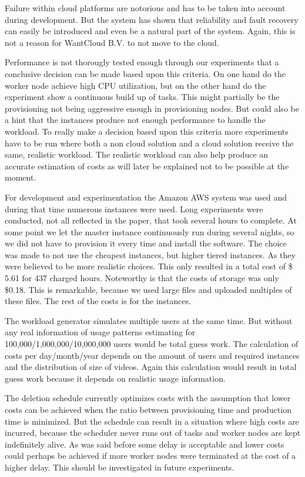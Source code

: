 \documentclass[a4paper]{IEEEtran}
\begin{document}
Failure within cloud platforms are notorious and has to be taken into account during development.
But the system has shown that reliability and fault recovery can easily be introduced
and even be a natural part of the system.
Again, this is not a reason for WantCloud B.V. to not move to the cloud.

Performance is not thorougly tested enough through our experiments that a conclusive decision can be made based upon this criteria.
On one hand do the worker node achieve high CPU utilization, but on the other hand do the experiment show a continuous build up of tasks.
This might partially be the provisioning not being aggressive enough in provisioning nodes.
But could also be a hint that the instances produce not enough performance to handle the workload.
To really make a decision based upon this criteria more experiments have to be run
where both a non cloud solution and a cloud solution receive the same, realistic workload.
The realistic workload can also help produce an accurate estimation of costs as will later be explained not to be possible at the moment.

For development and experimentation the Amazon AWS system was used and during that time numerous instances were used.
Long experiments were conducted, not all reflected in the paper, that took several hours to complete.
At some point we let the master instance continuously run during several nights, so we did not have to provision it every time and install the software.
The choice was made to not use the cheapest instances, but higher tiered instances.
As they were believed to be more realistic choices.
This only resulted in a total cost of \$ 5.61 for 437 charged hours.
Noteworthy is that the costs of storage was only \$0.18.
This is remarkable,
 because we used large files and uploaded multiples of these files.
The rest of the costs is for the instances.

The workload generator simulates multiple users at the same time.
But without any real information of usage patterns estimating for 100,000/1,000,000/10,000,000 users would be total guess work.
The calculation of costs per day/month/year depends on the amount of users and required instances and the distribution of size of videos.
Again this calculation would result in total guess work because it depends on realistic usage information.

The deletion schedule currently optimizes costs with the assumption that lower costs can be achieved when the ratio between provisioning time and production time is minimized. 
But the schedule can result in a situation where high costs are incurred,
because the scheduler never runs out of tasks and worker nodes are kept indefinitely alive.
As was said before some delay is acceptable and lower costs could perhaps be achieved if more worker nodes were terminated at the cost of a higher delay.
This should be investigated in future experiments.
\end{document}
